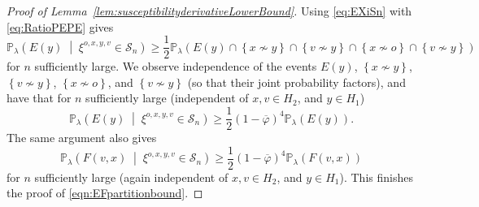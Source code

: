\documentclass[10pt,a4paper,dvipsnames]{article}
\theoremstyle{definition}
\theoremstyle{remark}
\newcommand{\pla}{\mathbb P_\lambda}
\newcommand{\Scal}{\mathcal{S}}
\newcommand{\orig}{o}
\newcommand{\connf}{\varphi}
\numberwithin{equation}{section}
\begin{document}
\begin{proof}[Proof of Lemma~\ref{lem:susceptibilityderivativeLowerBound}]
    Using \eqref{eq:EXiSn} with \eqref{eq:RatioPEPE} gives 
    \[\pla\left(E(y)\;\middle|\;\xi^{\orig,x,y,v}\in\Scal_n\right)
    \geq
    \frac12
    \pla\left(E(y)\cap\left\{x\not\sim y\right\}\cap \left\{v\not\sim y\right\}\cap\left\{x\not\sim \orig\right\}\cap\left\{v\not\sim y\right\}\right)
    \]
    for $n$ sufficiently large. 
    We observe independence of the events $E(y)$, $\left\{x\not\sim y\right\}$, $\left\{v\not\sim y\right\}$, $\left\{x\not\sim \orig\right\}$, and $\left\{v\not\sim y\right\}$ (so that their joint probability factors), and have that for $n$ sufficiently large (independent of $x,v\in H_2$, and $y\in H_1$)
    \begin{equation}
        \pla\left(E(y)\;\middle|\;\xi^{\orig,x,y,v}\in\Scal_n\right) \geq \frac{1}{2} \left(1-\overline{\connf}\right)^4\pla\left(E(y)\right).
    \end{equation}
    The same argument also gives
    \begin{equation}
        \pla\left(F(v,x)\;\middle|\;\xi^{\orig,x,y,v}\in\Scal_n\right) \geq \frac{1}{2} \left(1-\overline{\connf}\right)^4\pla\left(F(v,x)\right)
    \end{equation}
    for $n$ sufficiently large (again independent of $x,v\in H_2$, and $y\in H_1$). 
    This finishes the proof of \eqref{eqn:EFpartitionbound}. 
    


\end{proof}
\end{document}

